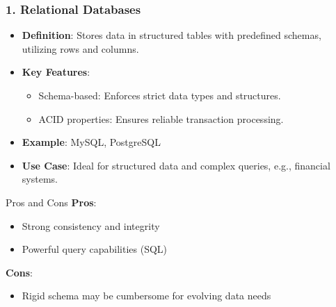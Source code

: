 \documentclass[aspectratio=169]{beamer}
\begin{document}
\begin{frame}[fragile]
    \frametitle{1. Relational Databases}
    \begin{itemize}
        \item \textbf{Definition}: Stores data in structured tables with predefined schemas, utilizing rows and columns.
        \item \textbf{Key Features}:
        \begin{itemize}
            \item Schema-based: Enforces strict data types and structures.
            \item ACID properties: Ensures reliable transaction processing.
        \end{itemize}
        \item \textbf{Example}: MySQL, PostgreSQL
        \item \textbf{Use Case}: Ideal for structured data and complex queries, e.g., financial systems.
    \end{itemize}
    
    \begin{block}{Pros and Cons}
        \textbf{Pros}:
        \begin{itemize}
            \item Strong consistency and integrity
            \item Powerful query capabilities (SQL)
        \end{itemize}
        
        \textbf{Cons}:
        \begin{itemize}
            \item Rigid schema may be cumbersome for evolving data needs
        \end{itemize}
    \end{block}
\end{frame}
\end{document}
